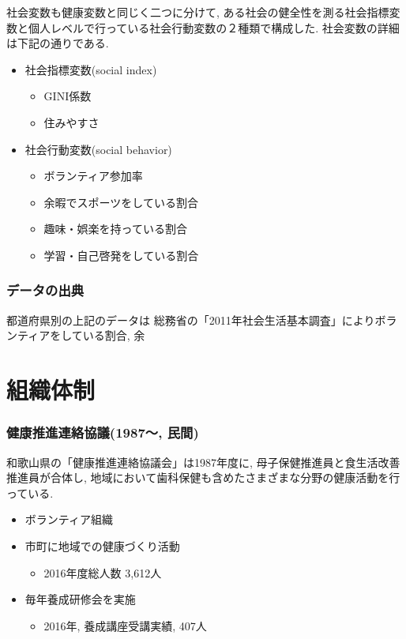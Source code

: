 社会変数も健康変数と同じく二つに分けて, ある社会の健全性を測る社会指標変数と個人レベルで行っている社会行動変数の２種類で構成した. 社会変数の詳細は下記の通りである.

\begin{itemize} \setlength{\itemsep}{-0.5mm} \setlength{\parskip}{-0.5mm}
	\item 社会指標変数(social index)
	      \begin{itemize} \setlength{\itemsep}{-0.5mm} \setlength{\parskip}{-0.5mm}
		      \item 	GINI係数
		      \item 	住みやすさ　%
	      \end{itemize}
	\item 社会行動変数(social behavior)
	      \begin{itemize} \setlength{\itemsep}{-0.5mm} \setlength{\parskip}{-0.5mm}
		      \item 	ボランティア参加率
		      \item 	余暇でスポーツをしている割合
		      \item 	趣味・娯楽を持っている割合
		      \item 	学習・自己啓発をしている割合
	      \end{itemize}
\end{itemize}

\subsection{データの出典}
都道府県別の上記のデータは
総務省の「2011年社会生活基本調査」によりボランティアをしている割合, 余



\chapter{組織体制}
\subsection{健康推進連絡協議(1987〜, 民間)}
和歌山県の「健康推進連絡協議会」は1987年度に, 母子保健推進員と食生活改善推進員が合体し, 地域において歯科保健も含めたさまざまな分野の健康活動を行っている.
\begin{itemize} \setlength{\itemsep}{-0.5mm} \setlength{\parskip}{-0.5mm}

	\item  ボランティア組織
	\item  市町に地域での健康づくり活動
	      \begin{itemize} \setlength{\itemsep}{-0.5mm} \setlength{\parskip}{-0.5mm}
		      \item 2016年度総人数 3,612人
	      \end{itemize}
	\item  毎年養成研修会を実施
	      \begin{itemize} \setlength{\itemsep}{-0.5mm} \setlength{\parskip}{-0.5mm}
		      \item 2016年, 養成講座受講実績, 407人
	      \end{itemize}
\end{itemize}

